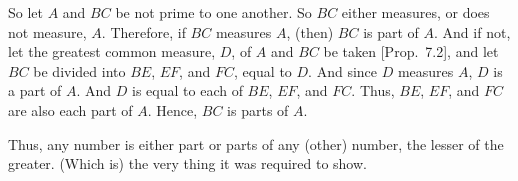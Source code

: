 \begin{Parallel}{}{}
{\epsfysize=2in
\centerline{}

So let  $A$ and $BC$  be not prime to one another. So $BC$ either measures, or
does not measure, $A$. Therefore, if $BC$ measures $A$,  (then) $BC$ is part of
$A$. And if not, let the greatest common measure, $D$, of $A$ and
$BC$ be taken [Prop.~7.2], and
let $BC$ be divided into $BE$, $EF$, and $FC$, equal to $D$. And since
$D$ measures $A$, $D$ is a part of $A$. And $D$ is equal to each of $BE$, $EF$, and
$FC$. Thus, $BE$, $EF$, and $FC$ are also each part of $A$. Hence, $BC$ is parts of $A$.

Thus, any number is either part or parts of any (other) number, the
lesser of the greater. (Which is) the very thing it was required to show.}
\end{Parallel}

